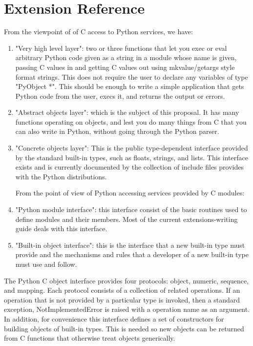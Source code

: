 
\section{Extension Reference}

From the viewpoint of of C access to Python services, we have:

\begin{enumerate}
  \item "Very high level layer": two or three functions that let you exec or
    eval arbitrary Python code given as a string in a module whose name is
    given, passing C values in and getting C values out using
    mkvalue/getargs style format strings.  This does not require the user
    to declare any variables of type "PyObject *".  This should be enough
    to write a simple application that gets Python code from the user,
    execs it, and returns the output or errors.

  \item "Abstract objects layer": which is the subject of this proposal.
    It has many functions operating on objects, and lest you do many
    things from C that you can also write in Python, without going
    through the Python parser.

  \item "Concrete objects layer": This is the public type-dependent
    interface provided by the standard built-in types, such as floats,
    strings, and lists.  This interface exists and is currently
    documented by the collection of include files provides with the
    Python distributions.

  From the point of view of Python accessing services provided by C
  modules: 

  \item "Python module interface": this interface consist of the basic
    routines used to define modules and their members.  Most of the
    current extensions-writing guide deals with this interface.

  \item "Built-in object interface": this is the interface that a new
    built-in type must provide and the mechanisms and rules that a
    developer of a new built-in type must use and follow.
\end{enumerate}

  The Python C object interface provides four protocols: object,
  numeric, sequence, and mapping.  Each protocol consists of a
  collection of related operations.  If an operation that is not
  provided by a particular type is invoked, then a standard exception,
  NotImplementedError is raised with a operation name as an argument.
  In addition, for convenience this interface defines a set of
  constructors for building objects of built-in types.  This is needed
  so new objects can be returned from C functions that otherwise treat
  objects generically.

